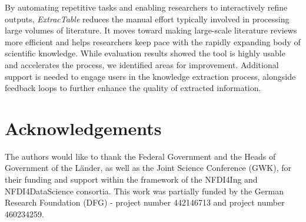 \documentclass[runningheads]{llncs}
\begin{document}
By automating repetitive tasks and enabling researchers to interactively refine outputs, \textit{ExtracTable} reduces the manual effort typically involved in processing large volumes of literature. It moves toward making large-scale literature reviews more efficient and helps researchers keep pace with the rapidly expanding body of scientific knowledge. While evaluation results showed the tool is highly usable and accelerates the process, we identified areas for improvement. Additional support is needed to engage users in the knowledge extraction process, alongside feedback loops to further enhance the quality of extracted information.

\section*{Acknowledgements}
The authors would like to thank the Federal Government and the Heads of Government of the Länder, as well as the Joint Science Conference (GWK), for their funding and support within the framework of the NFDI4Ing and NFDI4DataScience consortia. This work was partially funded by the German Research Foundation (DFG) - project number 442146713 and project number 460234259.



\end{document}

